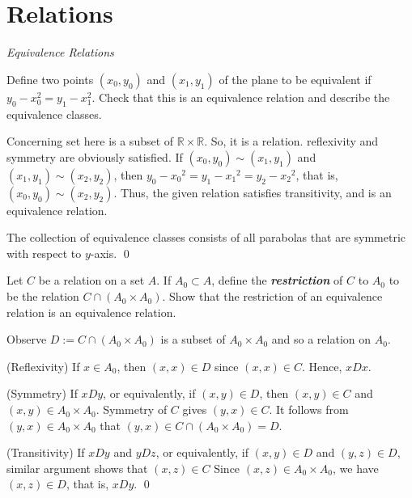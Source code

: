 \documentclass[a4paper,12pt]{article}
\begin{document}
\section{Relations}
\setcounter{exe}{0}
\textit{Equivalence Relations}
\begin{exe}
	Define two points \( (x_0,y_0) \) and \( (x_1,y_1) \) of the plane to be equivalent 
	if \( y_0 - x_0^{2} = y_1 - x_1^{2} \).
	Check that this is an equivalence relation and describe the equivalence classes.
\end{exe}\begin{sol}
	Concerning set here is a subset of
	\( \mathbb{R} \times \mathbb{R} \).
	So, it is a relation.
	reflexivity and symmetry are obviously satisfied.
	If
	\( (x_0,y_0) \sim (x_1,y_1) \)
	and
	\( (x_1,y_1) \sim (x_2,y_2) \),
	then
	\( y_0 - {x_0}^2 = y_1 - {x_1}^2 = y_2 - {x_2}^2\),
	that is,
	\( (x_0,y_0) \sim (x_2,y_2) \).
	Thus, the given relation satisfies transitivity,
	and is an equivalence relation.
	
	The collection of equivalence classes consists of all parabolas that are symmetric with respect to \( y \)-axis.
	\qed\end{sol}

\begin{exe}
	Let \( C \) be a relation on a set \( A \).
	If \( A_0\subset A \),
	define the \textbf{\textit{restriction}} of \( C \) to \( A_0 \) to be the relation
	\( C \cap (A_0\times A_0) \).
	Show that the restriction of an equivalence relation is an equivalence relation.
\end{exe}\begin{sol}
	Observe
	\( D:=C \cap (A_0 \times A_0) \)
	is a subset of \( A_0 \times A_0 \) and so a relation on \( A_0 \).
	
	(Reflexivity)
	If
	\( x \in A_0 \),
	then
	\( (x,x) \in D\)
	since
	\( (x,x) \in C\).
	Hence,
	\( xDx\).
	
	(Symmetry)
	If \( xDy \), or equivalently, if \( (x,y)\in D \),
	then
	\( (x,y) \in C \)
	and
	\( (x,y) \in A_0 \times A_0 \).
	Symmetry of \( C \) gives 
	\( (y,x) \in C \).
	It follows from
	\( (y,x) \in A_0 \times A_0 \)
	that 
	\( (y,x) \in C \cap (A_0 \times A_0) = D \).
	
	(Transitivity)
	If \( xDy \)
	and
	\( yDz \),
	or equivalently, if
	\( (x,y)\in D \)
	and
	\( (y,z) \in D \),
	similar argument shows that
	\( (x,z) \in C \)
	Since
	\( (x,z) \in A_0 \times A_0 \),
	we have
	\( (x,z) \in D \),
	that is,
	\( xDy \).
	\qed\end{sol}
\end{document}
